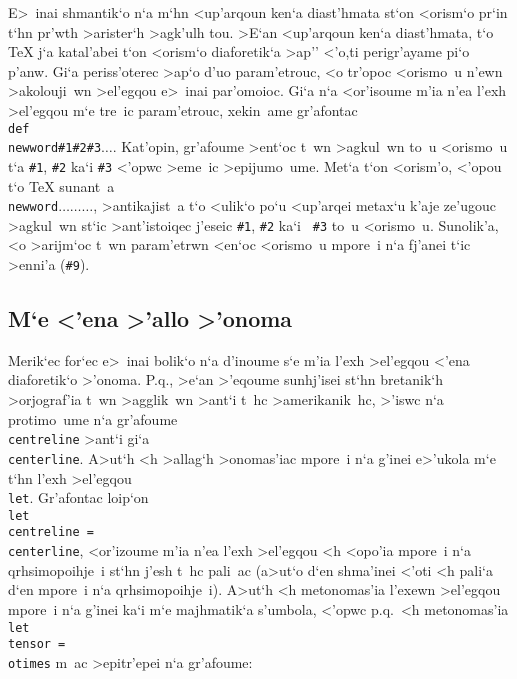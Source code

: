 E>~inai shmantik`o n`a m`hn <up'arqoun ken`a diast'hmata st`on <orism`o
pr`in t`hn pr'wth >arister`h >agk'ulh tou. >E`an <up'arqoun ken`a
diast'hmata, t`o {\rm\TeX} j`a katal'abei t`on <orism`o diaforetik`a
>ap'' <'o,ti perigr'ayame pi`o p'anw.  Gi`a periss'oterec >ap`o d'uo
param'etrouc, <o tr'opoc <orismo~u n'ewn >akolouji~wn >el'egqou e>~inai
par'omoioc.  Gi`a n`a <or'isoume m'ia n'ea l'exh >el'egqou m`e tre~ic
param'etrouc, xekin~ame gr'afontac {\tt
\\def\\newword\#1\#2\#3\lb$\ldots$\rb}.  Kat'opin, gr'afoume >ent`oc
t~wn >agkul~wn to~u <orismo~u t`a {\tt \#1}, {\tt \#2} ka`i {\tt \#3}
<'opwc >eme~ic >epijumo~ume.  Met`a t`on <orism'o, <'opou t`o {\rm \TeX}
sunant~a {\tt \\newword\lb$\ldots$\rb\lb$\ldots$\rb\lb$\ldots$\rb},
>antikajist~a t`o <ulik`o po`u <up'arqei metax`u k'aje ze'ugouc
>agkul~wn st`ic >ant'istoiqec j'eseic {\tt \#1}, {\tt \#2} ka`i {\tt
\#3} to~u <orismo~u.  Sunolik'a, <o >arijm`oc t~wn param'etrwn <en`oc
<orismo~u mpore~i n`a fj'anei t`ic >enni'a ({\tt\#9}).

\subsection{M`e <'ena >'allo >'onoma}  
  
Merik`ec for`ec e>~inai bolik`o n`a d'inoume s`e m'ia l'exh >el'egqou
<'ena diaforetik`o >'onoma.  P.q., >e`an >'eqoume sunhj'isei st`hn
bretanik`h >orjograf'ia t~wn >agglik~wn >ant`i t~hc >amerikanik~hc,
>'iswc n`a protimo~ume n`a gr'afoume {\tt \\centreline} >ant`i gi`a {\tt
\\centerline}.  A>ut`h <h >allag`h >onomas'iac mpore~i n`a g'inei
e>'u\-kola m`e t`hn l'exh >el'egqou {\tt \\let}.  Gr'afontac loip`on
{\tt \\let \\centreline = \\centerline}, <or'izoume m'ia n'ea l'exh
>el'egqou <h <opo'ia mpore~i n`a qrhsimopoihje~i st`hn j'esh t~hc
pali~ac (a>ut`o d`en shma'inei <'oti <h pali`a d`en mpore~i n`a
qrhsimopoihje~i).  A>ut`h <h metonomas'ia l'exewn >el'egqou mpore~i n`a g'inei
ka`i m`e majhmatik`a s'umbola, <'opwc p.q.\ <h metonomas'ia {\tt \\let
\\tensor = \\otimes} m~ac >epitr'epei n`a gr'afoume:%

